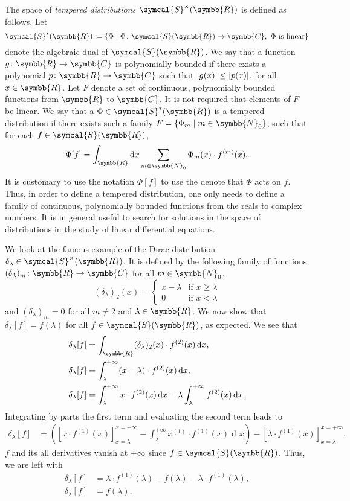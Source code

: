 \documentclass[12pt, a4 paper]{article}
\theoremstyle{definition}
\newcommand{\rr}{\symbb{R}}
\newcommand{\cc}{\symbb{C}}
\newcommand{\nn}{\symbb{N}_0}
\newcommand{\dirac}{\delta}
\newcommand{\schwartz}{\symcal{S}}
\newcommand{\schwartzr}{\schwartz(\rr)}
\newcommand{\dist}{\schwartz^\times}
\newcommand{\distr}{\dist(\rr)}
\newcommand{\distar}{\schwartz^*(\rr)}
\newcommand{\family}{F}
\DeclarePairedDelimiter{\abs}{\lvert}{\rvert}
\newcommand{\der}{\operatorname{d\!}{}}
\begin{document}
    The space of \textit{tempered distributions} $\distr$ is defined as follows. Let
    \[
    \distar \coloneq \{\Phi \mid \Phi \colon \schwartzr \rightarrow \cc, \text{ $\Phi$ is linear}\}
    \] denote the algebraic dual of $\schwartzr$.  We say that a function $g \colon \rr \rightarrow \cc$ is polynomially bounded if there exists a polynomial $p \colon \rr \rightarrow \cc$ such that $\abs{g(x)} \leq \abs{p(x)}$, for all $x\in \rr$. Let $\family$ denote a set of continuous, polynomially bounded functions from $\rr$ to $\cc$. It is not required that elements of $\family$ be linear. We say that a $\Phi \in \distar$ is a tempered distribution if there exists such a family $\family = \{\Phi_m \mid m \in \nn\}$, such that for each $f\in \schwartzr$,
    \[
    \Phi[f] = \int_{\rr} \der x \sum_{m \in \nn} \Phi_m (x) \cdot f^{(m)} (x).
    \]
    It is customary to use the notation $\Phi[f]$ to use the denote that $\Phi$ acts on $f$. Thus, in order to define a tempered distribution, one only needs to define a family of  continuous, polynomially bounded functions from the reals to complex numbers. It is in general useful to search for solutions in the space of distributions in the study of linear differential equations.

    We look at the famous example of the Dirac distribution $\dirac_\lambda \in \distr$. It is defined by the following family of functions. $(\dirac_\lambda)_m \colon \rr \rightarrow \cc$ for all $m \in \nn$.
    \[
    (\dirac_\lambda)_2 (x) =
    \begin{cases}
        x - \lambda & \text{if $x \geq \lambda$}\\
        0 & \text{if $x < \lambda$}
    \end{cases}
    \]
    and $(\dirac_\lambda)_m = 0$ for all $m \neq 2$ and $\lambda \in \rr$. We now show that $\dirac_\lambda[f] = f(\lambda)$ for all $f \in \schwartzr$, as expected. We see that
    \begin{align*}
        \dirac_\lambda [f] &= \int_{\rr} (\dirac_\lambda)_2 (x) \cdot f^{(2)} (x) \der x,\\
        \dirac_\lambda [f] &= \int_\lambda^{+\infty} (x - \lambda)\cdot f^{(2)} (x) \der x,\\
        \dirac_\lambda [f] &= \int_\lambda^{+\infty} x\cdot f^{(2)} (x) \der x - \lambda \int_\lambda^{+\infty} f^{(2)} (x) \der x.
    \end{align*}
    Integrating by parts the first term and evaluating the second term leads to
    \begin{align*}
        \dirac_\lambda [f] &= \left(\left[x \cdot f^{(1)}(x)\right]_{x = \lambda}^{x = +\infty} - \int_\lambda^{+\infty} x^{(1)}\cdot f^{(1)} (x) \der x\right) - \left[\lambda \cdot f^{(1)} (x)\right]_{x = \lambda}^{x = +\infty}.
    \end{align*}
    $f$ and its all derivatives vanish at $+\infty$ since $f \in \schwartzr$. Thus, we are left with
    \begin{align*}
        \dirac_\lambda [f] &= \lambda \cdot f^{(1)}(\lambda) - f(\lambda) - \lambda \cdot f^{(1)}(\lambda),\\
        \dirac_\lambda [f] &= f(\lambda).
    \end{align*}
\end{document}
